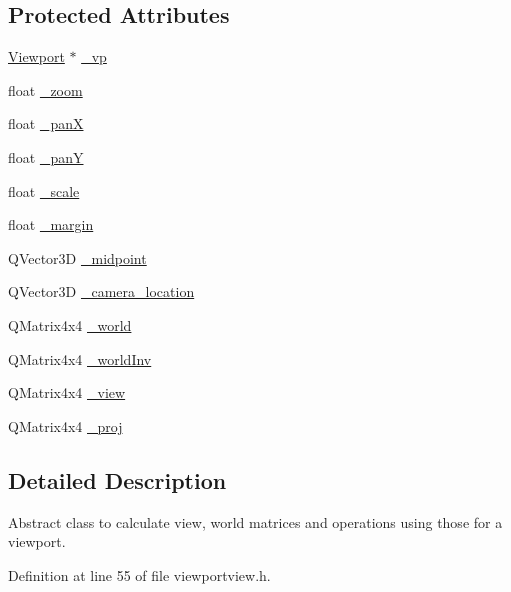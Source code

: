 \subsection*{Protected Attributes}
\begin{DoxyCompactItemize}
\item 
\hyperlink{classShipCAD_1_1Viewport}{Viewport} $\ast$ \hyperlink{classShipCAD_1_1ViewportView_a9d980ea46c1638d05221dc71e666da04}{\-\_\-vp}
\item 
float \hyperlink{classShipCAD_1_1ViewportView_a337e90ffddd63535bad9b8de652a455a}{\-\_\-zoom}
\item 
float \hyperlink{classShipCAD_1_1ViewportView_a3cccfb1058f0c8f66d662c1f19ed5c33}{\-\_\-pan\-X}
\item 
float \hyperlink{classShipCAD_1_1ViewportView_aa2a8062a009ea1a9f26498a103134d3f}{\-\_\-pan\-Y}
\item 
float \hyperlink{classShipCAD_1_1ViewportView_a808cc636969188f7c04c97902ecbe9d5}{\-\_\-scale}
\item 
float \hyperlink{classShipCAD_1_1ViewportView_a4cce24be9f8367c04714cd5f091ad637}{\-\_\-margin}
\item 
Q\-Vector3\-D \hyperlink{classShipCAD_1_1ViewportView_af4017af3ac64751ce2c5f348d2567657}{\-\_\-midpoint}
\item 
Q\-Vector3\-D \hyperlink{classShipCAD_1_1ViewportView_ac357a478169de078d3dc3289a15612b1}{\-\_\-camera\-\_\-location}
\item 
Q\-Matrix4x4 \hyperlink{classShipCAD_1_1ViewportView_a1b2d9753e22af2e9a071e60799478905}{\-\_\-world}
\item 
Q\-Matrix4x4 \hyperlink{classShipCAD_1_1ViewportView_a6b16d2dd6a5c1b812e9fa96dfcadebbb}{\-\_\-world\-Inv}
\item 
Q\-Matrix4x4 \hyperlink{classShipCAD_1_1ViewportView_a56588119357f01d0764219252695e9c5}{\-\_\-view}
\item 
Q\-Matrix4x4 \hyperlink{classShipCAD_1_1ViewportView_abb5933e4e5cbe5c97be2b63164cc8380}{\-\_\-proj}
\end{DoxyCompactItemize}


\subsection{Detailed Description}
Abstract class to calculate view, world matrices and operations using those for a viewport. 

Definition at line 55 of file viewportview.\-h.



